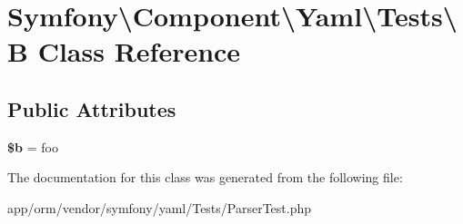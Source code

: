 \hypertarget{classSymfony_1_1Component_1_1Yaml_1_1Tests_1_1B}{}\section{Symfony\textbackslash{}Component\textbackslash{}Yaml\textbackslash{}Tests\textbackslash{}B Class Reference}
\label{classSymfony_1_1Component_1_1Yaml_1_1Tests_1_1B}
\subsection*{Public Attributes}
\begin{DoxyCompactItemize}
\item 
{\bfseries \$b} = \textquotesingle{}foo\textquotesingle{}\hypertarget{classSymfony_1_1Component_1_1Yaml_1_1Tests_1_1B_a1f13ab27e0f4eda665ca04cba933a88e}{}\label{classSymfony_1_1Component_1_1Yaml_1_1Tests_1_1B_a1f13ab27e0f4eda665ca04cba933a88e}

\end{DoxyCompactItemize}


The documentation for this class was generated from the following file\+:\begin{DoxyCompactItemize}
\item 
app/orm/vendor/symfony/yaml/\+Tests/Parser\+Test.\+php\end{DoxyCompactItemize}

